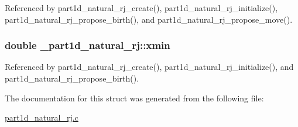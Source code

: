 Referenced by part1d\+\_\+natural\+\_\+rj\+\_\+create(), part1d\+\_\+natural\+\_\+rj\+\_\+initialize(), part1d\+\_\+natural\+\_\+rj\+\_\+propose\+\_\+birth(), and part1d\+\_\+natural\+\_\+rj\+\_\+propose\+\_\+move().

\subsubsection[{\texorpdfstring{xmin}{xmin}}]{\setlength{\rightskip}{0pt plus 5cm}double \+\_\+part1d\+\_\+natural\+\_\+rj\+::xmin}\hypertarget{struct__part1d__natural__rj_adb78cdc9ded6916d88a590efdb6f03e9}{}\label{struct__part1d__natural__rj_adb78cdc9ded6916d88a590efdb6f03e9}


Referenced by part1d\+\_\+natural\+\_\+rj\+\_\+create(), part1d\+\_\+natural\+\_\+rj\+\_\+initialize(), and part1d\+\_\+natural\+\_\+rj\+\_\+propose\+\_\+birth().



The documentation for this struct was generated from the following file\+:\begin{DoxyCompactItemize}
\item 
\hyperlink{part1d__natural__rj_8c}{part1d\+\_\+natural\+\_\+rj.\+c}\end{DoxyCompactItemize}
